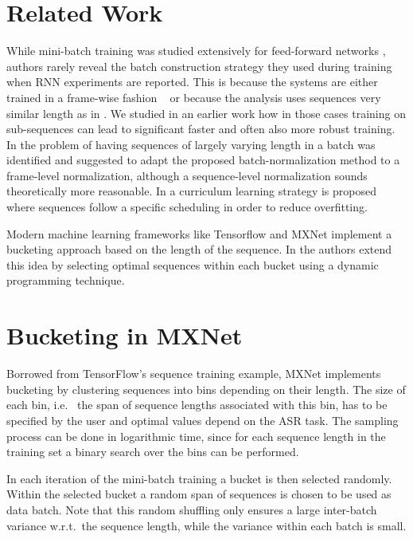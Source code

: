 \documentclass{article}
\begin{document}
  \section{Related Work} \label{sec:related}
  	While mini-batch training was studied extensively for feed-forward networks \cite{Li16}, authors rarely reveal the batch construction strategy they used during training when 
  	RNN experiments are reported. This is because the systems are either trained in a frame-wise
  	fashion ~\cite{2016arXiv161005256X} or because the analysis uses sequences very similar length as in \cite{PascanuMB13}. We studied in an earlier work \cite{Doetsch14} how in those cases training on sub-sequences can lead to significant faster and often also more robust training. 
  	In \cite{Laurent16} the problem of having sequences of largely varying length in a batch was identified and 
  	suggested to adapt the proposed batch-normalization method to a frame-level normalization, 
  	although a sequence-level normalization sounds theoretically more reasonable. In \cite{Bengio15} a curriculum learning strategy is proposed where sequences follow a specific scheduling in order to reduce overfitting.
  	
  	Modern machine learning frameworks like Tensorflow \cite{tensorflow} and 
  	MXNet \cite{mxnet} implement a bucketing approach based on the length of the sequence. In  \cite{Khomenko06} the authors extend this idea by selecting optimal sequences within each bucket using a dynamic programming technique.

  \section{Bucketing in MXNet} \label{sec:bucketing}
  Borrowed from TensorFlow's sequence training example, MXNet implements bucketing by 
  clustering sequences into bins depending on their length. The size of each bin, i.e.~ the span of 
  sequence lengths associated with this bin, has to be specified by the user and optimal values 
  depend on the ASR task. The sampling process can be done in logarithmic time, since for each sequence length in the training set a binary search over the bins can be performed. 
    
  In each iteration of the mini-batch training a bucket is then selected randomly. Within the selected bucket a random span of sequences is chosen to be used as data batch. Note that this random shuffling only ensures a large inter-batch variance w.r.t.~the sequence length, while the variance 
  within each batch is small.
  
\end{document}
